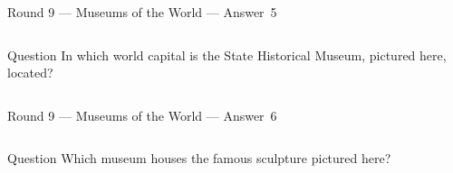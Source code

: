 \documentclass[11pt]{beamer}
\begin{document}
\begin{frame}[t]{Round 9 --- Museums of the World --- \mbox{Answer 5}}
\vspace{-0.5em}
\begin{columns}[T,totalwidth=\linewidth]
\begin{column}{0.32\linewidth}
\begin{block}{Question}
In which world capital is the State Historical Museum, pictured here, located?
\end{block}
\end{column}
\begin{column}{0.65\linewidth}
\begin{center}
\texttt{[image: \{Images/muzyey]}.jpg}
\end{center}
\end{column}
\end{columns}
\end{frame}
\begin{frame}[t]{Round 9 --- Museums of the World --- \mbox{Answer 6}}
\vspace{-0.5em}
\begin{columns}[T,totalwidth=\linewidth]
\begin{column}{0.32\linewidth}
\begin{block}{Question}
Which museum houses the famous sculpture pictured here?
\end{block}
\end{column}
\begin{column}{0.65\linewidth}
\begin{center}
\texttt{[image: \{Images/venusdemilo]}.jpg}
\end{center}
\end{column}
\end{columns}
\end{frame}
\end{document}
